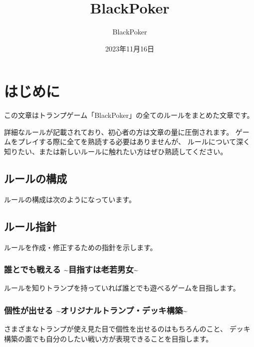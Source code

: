 \documentclass[letterpaper,10pt,dvipdfmx]{sphinxmanual}
\title{BlackPoker}
\date{2023年11月16日}
\author{BlackPoker}
\begin{document}
\pagestyle{empty}
\sphinxmaketitle
\pagestyle{plain}
\sphinxtableofcontents
\pagestyle{normal}
\label{\detokenize{index::doc}}
\ignorespaces 


\sphinxstepscope


\chapter{はじめに}
\label{\detokenize{init/init:id1}}\label{\detokenize{init/init::doc}}
\sphinxAtStartPar
この文章はトランプゲーム「BlackPoker」の全てのルールをまとめた文章です。

\sphinxAtStartPar
詳細なルールが記載されており、初心者の方は文章の量に圧倒されます。
ゲームをプレイする際に全てを熟読する必要はありませんが、
ルールについて深く知りたい、または新しいルールに触れたい方はぜひ熟読してください。


\section{ルールの構成}
\label{\detokenize{init/init:id2}}
\sphinxAtStartPar
ルールの構成は次のようになっています。

\noindent{}


\section{ルール指針}
\label{\detokenize{init/init:id3}}
\sphinxAtStartPar
ルールを作成・修正するための指針を示します。


\subsection{誰とでも戦える \textasciitilde{}目指すは老若男女\textasciitilde{}}
\label{\detokenize{init/init:id4}}
\sphinxAtStartPar
ルールを知りトランプを持っていれば誰とでも遊べるゲームを目指します。


\subsection{個性が出せる \textasciitilde{}オリジナルトランプ・デッキ構築\textasciitilde{}}
\label{\detokenize{init/init:id5}}
\sphinxAtStartPar
さまざまなトランプが使え見た目で個性を出せるのはもちろんのこと、
デッキ構築の面でも自分のしたい戦い方が表現できることを目指します。
\end{document}
